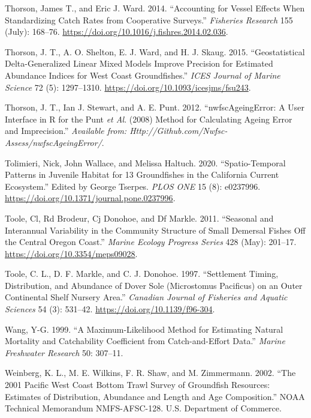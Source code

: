\documentclass[11pt,
  english,
  a4paper,
]{article}
\begin{document}
\begin{cslreferences}
\leavevmode\hypertarget{ref-thorson_accounting_2014}{}%
Thorson, James T., and Eric J. Ward. 2014. ``Accounting for Vessel Effects When Standardizing Catch Rates from Cooperative Surveys.'' \emph{Fisheries Research} 155 (July): 168--76. \url{https://doi.org/10.1016/j.fishres.2014.02.036}.

\leavevmode\hypertarget{ref-thorson_geostatistical_2015}{}%
Thorson, J. T., A. O. Shelton, E. J. Ward, and H. J. Skaug. 2015. ``Geostatistical Delta-Generalized Linear Mixed Models Improve Precision for Estimated Abundance Indices for West Coast Groundfishes.'' \emph{ICES Journal of Marine Science} 72 (5): 1297--1310. \url{https://doi.org/10.1093/icesjms/fsu243}.

\leavevmode\hypertarget{ref-thorson_nwfscageingerror:_2012}{}%
Thorson, J. T., Ian J. Stewart, and A. E. Punt. 2012. ``nwfscAgeingError: A User Interface in R for the Punt \emph{et Al}. (2008) Method for Calculating Ageing Error and Imprecision.'' \emph{Available from: Http://Github.com/Nwfsc-Assess/nwfscAgeingError/}.

\leavevmode\hypertarget{ref-tolimieri_spatio-temporal_2020}{}%
Tolimieri, Nick, John Wallace, and Melissa Haltuch. 2020. ``Spatio-Temporal Patterns in Juvenile Habitat for 13 Groundfishes in the California Current Ecosystem.'' Edited by George Tserpes. \emph{PLOS ONE} 15 (8): e0237996. \url{https://doi.org/10.1371/journal.pone.0237996}.

\leavevmode\hypertarget{ref-toole_seasonal_2011}{}%
Toole, Cl, Rd Brodeur, Cj Donohoe, and Df Markle. 2011. ``Seasonal and Interannual Variability in the Community Structure of Small Demersal Fishes Off the Central Oregon Coast.'' \emph{Marine Ecology Progress Series} 428 (May): 201--17. \url{https://doi.org/10.3354/meps09028}.

\leavevmode\hypertarget{ref-toole_settlement_1997}{}%
Toole, C. L., D. F. Markle, and C. J. Donohoe. 1997. ``Settlement Timing, Distribution, and Abundance of Dover Sole (Microstomus Pacificus) on an Outer Continental Shelf Nursery Area.'' \emph{Canadian Journal of Fisheries and Aquatic Sciences} 54 (3): 531--42. \url{https://doi.org/10.1139/f96-304}.

\leavevmode\hypertarget{ref-Wang1999}{}%
Wang, Y-G. 1999. ``A Maximum-Likelihood Method for Estimating Natural Mortality and Catchability Coefficient from Catch-and-Effort Data.'' \emph{Marine Freshwater Research} 50: 307--11.

\leavevmode\hypertarget{ref-weinberg_2001_2002}{}%
Weinberg, K. L., M. E. Wilkins, F. R. Shaw, and M. Zimmermann. 2002. ``The 2001 Pacific West Coast Bottom Trawl Survey of Groundfish Resources: Estimates of Distribution, Abundance and Length and Age Composition.'' NOAA Technical Memorandum NMFS-AFSC-128. U.S. Department of Commerce.


\end{cslreferences}
\end{document}
